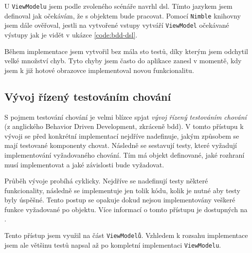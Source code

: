 U \texttt{ViewModelu} jsem podle zvoleného scénáře navrhl \acrshort{dsl}.
Tímto jazykem jsem definoval jak očekávám, že s objektem bude pracovat.
Pomocí \texttt{Nimble} knihovny jsem dále ověřoval, jestli na vytvořené vstupy vytváří \texttt{ViewModel} očekávané výstupy jak je vidět v ukázce \ref{code:bdd-dsl}.

Během implementace jsem vytvořil bez mála sto testů, díky kterým jsem odchytil velké množství chyb.
Tyto chyby jsem často do aplikace zanesl v momentě, kdy jsem k již hotové obrazovce implementoval novou funkcionalitu.


\subsection{Vývoj řízený testováním chování}

S pojmem testování chování je velmi blízce spjat \textit{vývoj řízený testováním chování} (z anglického Behavior Driven Development, zkráceně \acrshort{bdd}).
V tomto přístupu k vývoji se před konkrétní implementací nejdříve nadefinuje, jakým způsobem se mají testované komponenty chovat.
Následně se sestavují testy, které vyžadují implementování vyžadovaného chování.
Tím má objekt definované, jaké rozhraní musí implementovat a jaké závislosti bude vyžadovat.

Průběh vývoje probíhá cyklicky.
Nejdříve se nadefinují testy některé funkcionality, následně se implementuje jen tolik kódu, kolik je nutné aby testy byly úspěšné.
Tento postup se opakuje dokud nejsou implementovány veškeré funkce vyžadované po objektu.
Více informací o tomto přístupu je dostupných na \cite{objcio-bdd}.

Tento přístup jsem využil na část \texttt{ViewModelů}.
Vzhledem k rozsahu implementace jsem ale většinu testů napsal až po kompletní implementaci \texttt{ViewModelu}.
